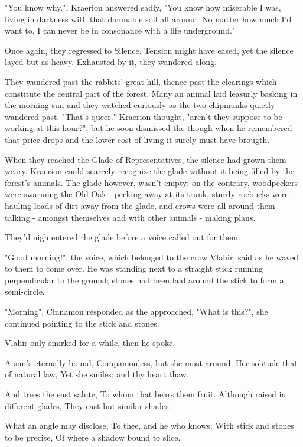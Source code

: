 "You know why.", Kraerion answered sadly, "You know how miserable I was, living in darkness with that damnable soil all around. No matter how much I'd want to, I can never be in consonance with a life underground."

Once again, they regressed to Silence. Tension might have eased, yet the silence layed but as heavy. Exhausted by it, they wandered along.

They wandered past the rabbits' great hill, thence past the clearings which constitute the central part of the forest. Many an animal laid leasurly basking in the morning sun and they watched curiously as the two chipmunks quietly wandered past. "That's queer." Kraerion thought, "aren't they suppose to be working at this hour?", but he soon dismissed the though when he remembered that price drops and the lower cost of living it surely must have brougth. %

When they reached the Glade of Representatives, the silence had grown them weary. Kraerion could scarcely recognize the glade without it being filled by the forest's animals. The glade however, wasn't empty; on the contrary, woodpeckers were swarming the Old Oak - pecking away at its trunk, sturdy roebucks were hauling loads of dirt away from the glade, and crows were all around them talking - amongst themselves and with other animals - making plans. 

They'd nigh entered the glade before a voice called out for them.

"Good morning!", the voice, which belonged to the crow Vlahir, said as he waved to them to come over. He was standing next to a straight stick running perpendicular to the ground; stones had been laid around the stick to form a semi-circle. 

"Morning", Cinnamon responded as the approached, "What is this?", she continued pointing to the stick and stones.

Vlahir only smirked for a while, then he spoke.

	A sun's eternally bound,
	Companionless, but she must around;
	Her solitude that of natural law,%
	Yet she smiles; and thy heart thaw.

	And trees the east salute,
	To whom that bears them fruit.
	Although raised in different glades,
	They cast but similar shades.

	What an angle may disclose,
	To thee, and he who knows; %
	With stick and stones to be precise,
	Of where a shadow bound to slice.

